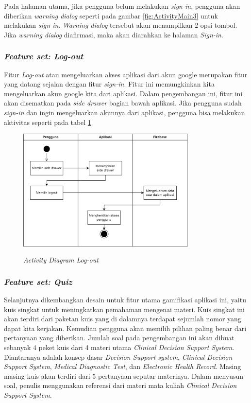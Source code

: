Pada halaman utama, jika pengguna belum melakukan \textit{sign-in}, pengguna akan diberikan \textit{warning dialog} seperti pada gambar \ref*{fig:ActivityMain3} untuk melakukan \textit{sign-in}.
\textit{Warning dialog} tersebut akan menampilkan 2 opsi tombol. Jika \textit{warning dialog} diafirmasi, maka akan diarahkan ke halaman \textit{Sign-in}.
\subsubsection{\textit{Feature set: Log-out}}
Fitur \textit{Log-out} atau mengeluarkan akses aplikasi dari akun google merupakan fitur yang datang sejalan dengan fitur \textit{sign-in}.
Fitur ini memungkinkan kita mengeluarkan akun google kita dari aplikasi. Dalam pengembangan ini, fitur ini akan disematkan pada \textit{side drawer} bagian bawah aplikasi.
Jika pengguna sudah \textit{sign-in} dan ingin mengeluarkan akunnya dari aplikasi, pengguna bisa melakukan aktivitas seperti pada tabel \ref*{Fig:ActivityOut}
\begin{figure}[H]
	\centering
	\caption{\textit{Activity Diagram Log-out}}
	\includegraphics[width=0.8\textwidth]{contents/chapter-3/images/AD-signout.png}
	\label{Fig:ActivityOut}
\end{figure}
\subsubsection{\textit{Feature set: Quiz}}
Selanjutnya dikembangkan desain untuk fitur utama gamifikasi aplikasi ini, yaitu kuis singkat untuk meningkatkan pemahaman mengenai materi.
Kuis singkat ini akan terdiri dari paketan kuis yang di dalamnya terdapat sejumlah nomor yang dapat kita kerjakan. Kemudian pengguna akan memilih pilihan paling benar dari pertanyaan yang diberikan.
Jumlah soal pada pengembangan ini akan dibuat sebanyak 4 peket kuis dari 4 materi utama \textit{Clinical Decision Support System}. Diantaranya adalah konsep dasar \textit{Decision Support system}, \textit{Clinical Decision Support System}, \textit{Medical Diagnostic Test}, dan \textit{Electronic Health Record}.
Masing masing kuis akan terdiri dari 5 pertanyaan seputar materinya. Dalam menyusun soal, penulis menggunakan referensi dari materi mata kuliah \textit{Clinical Decision Support System}.

